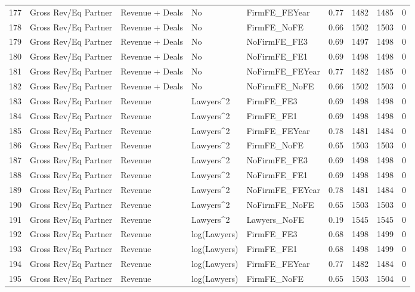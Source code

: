\begin{table}[ht]
\begin{tabular}{rllllllll}
  177 & Gross Rev/Eq Partner & Revenue + Deals & No & FirmFE\_FEYear & 0.77 & 1482 & 1485 & 0 \\ 
  178 & Gross Rev/Eq Partner & Revenue + Deals & No & FirmFE\_NoFE & 0.66 & 1502 & 1503 & 0 \\ 
  179 & Gross Rev/Eq Partner & Revenue + Deals & No & NoFirmFE\_FE3 & 0.69 & 1497 & 1498 & 0 \\ 
  180 & Gross Rev/Eq Partner & Revenue + Deals & No & NoFirmFE\_FE1 & 0.69 & 1498 & 1498 & 0 \\ 
  181 & Gross Rev/Eq Partner & Revenue + Deals & No & NoFirmFE\_FEYear & 0.77 & 1482 & 1485 & 0 \\ 
  182 & Gross Rev/Eq Partner & Revenue + Deals & No & NoFirmFE\_NoFE & 0.66 & 1502 & 1503 & 0 \\ 
  183 & Gross Rev/Eq Partner & Revenue & Lawyers^2 & FirmFE\_FE3 & 0.69 & 1498 & 1498 & 0 \\ 
  184 & Gross Rev/Eq Partner & Revenue & Lawyers^2 & FirmFE\_FE1 & 0.69 & 1498 & 1498 & 0 \\ 
  185 & Gross Rev/Eq Partner & Revenue & Lawyers^2 & FirmFE\_FEYear & 0.78 & 1481 & 1484 & 0 \\ 
  186 & Gross Rev/Eq Partner & Revenue & Lawyers^2 & FirmFE\_NoFE & 0.65 & 1503 & 1503 & 0 \\ 
  187 & Gross Rev/Eq Partner & Revenue & Lawyers^2 & NoFirmFE\_FE3 & 0.69 & 1498 & 1498 & 0 \\ 
  188 & Gross Rev/Eq Partner & Revenue & Lawyers^2 & NoFirmFE\_FE1 & 0.69 & 1498 & 1498 & 0 \\ 
  189 & Gross Rev/Eq Partner & Revenue & Lawyers^2 & NoFirmFE\_FEYear & 0.78 & 1481 & 1484 & 0 \\ 
  190 & Gross Rev/Eq Partner & Revenue & Lawyers^2 & NoFirmFE\_NoFE & 0.65 & 1503 & 1503 & 0 \\ 
  191 & Gross Rev/Eq Partner & Revenue & Lawyers^2 & Lawyers\_NoFE & 0.19 & 1545 & 1545 & 0 \\ 
  192 & Gross Rev/Eq Partner & Revenue & log(Lawyers) & FirmFE\_FE3 & 0.68 & 1498 & 1499 & 0 \\ 
  193 & Gross Rev/Eq Partner & Revenue & log(Lawyers) & FirmFE\_FE1 & 0.68 & 1498 & 1499 & 0 \\ 
  194 & Gross Rev/Eq Partner & Revenue & log(Lawyers) & FirmFE\_FEYear & 0.77 & 1482 & 1484 & 0 \\ 
  195 & Gross Rev/Eq Partner & Revenue & log(Lawyers) & FirmFE\_NoFE & 0.65 & 1503 & 1504 & 0 \\ 

\end{tabular}
\end{table}
